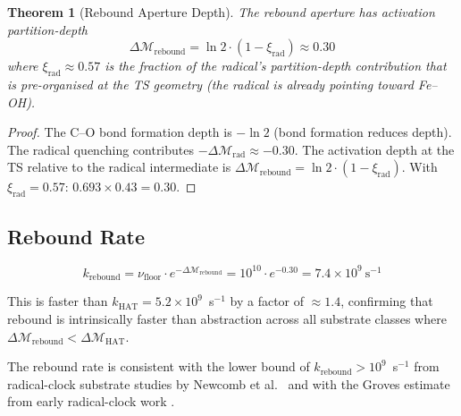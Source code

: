 \documentclass[11pt,twocolumn,a4paper]{article}
\newtheorem{theorem}{Theorem}[section]
\theoremstyle{definition}
\theoremstyle{remark}
\newcommand{\depth}{\mathcal{M}}
\newcommand{\kHAT}{k_{\mathrm{HAT}}}
\newcommand{\krebound}{k_{\mathrm{rebound}}}
\begin{document}
\begin{theorem}[Rebound Aperture Depth]
\label{thm:rebound_depth}
The rebound aperture has activation partition-depth
\begin{equation}
\Delta\depth_{\mathrm{rebound}} = \ln 2 \cdot (1 - \xi_{\mathrm{rad}})
\approx 0.30
\label{eq:rebound_depth}
\end{equation}
where $\xi_{\mathrm{rad}} \approx 0.57$ is the fraction of the radical's
partition-depth contribution that is pre-organised at the TS geometry
(the radical is already pointing toward Fe--OH).
\end{theorem}

\begin{proof}
The C--O bond formation depth is $-\ln 2$ (bond formation reduces depth).
The radical quenching contributes $-\Delta\depth_{\mathrm{rad}} \approx -0.30$.
The activation depth at the TS relative to the radical intermediate is
$\Delta\depth_{\mathrm{rebound}} = \ln 2 \cdot (1 - \xi_{\mathrm{rad}})$.
With $\xi_{\mathrm{rad}} = 0.57$: $0.693 \times 0.43 = 0.30$.
\end{proof}

\subsection{Rebound Rate}

\begin{equation}
\krebound = \nu_{\mathrm{floor}} \cdot e^{-\Delta\depth_{\mathrm{rebound}}}
= 10^{10} \cdot e^{-0.30} = 7.4 \times 10^9~\mathrm{s}^{-1}
\label{eq:rebound_rate}
\end{equation}

This is faster than $\kHAT = 5.2 \times 10^9$~s$^{-1}$ by a factor of $\approx 1.4$,
confirming that rebound is intrinsically faster than abstraction across all
substrate classes where $\Delta\depth_{\mathrm{rebound}} < \Delta\depth_{\mathrm{HAT}}$.

The rebound rate is consistent with the lower bound of $\krebound > 10^9$~s$^{-1}$
from radical-clock substrate studies by Newcomb et al.~\citep{newcomb1995,
newcomb1997} and with the Groves estimate from early radical-clock work
\citep{groves1985}.
\end{document}
